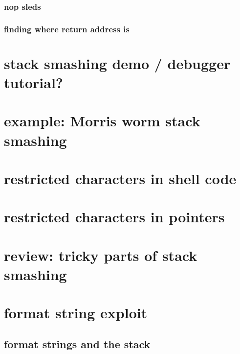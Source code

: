 \subsubsection{nop sleds}




\subsubsection{finding where return address is}


\section{stack smashing demo / debugger tutorial?}


\section{example: Morris worm stack smashing}



\section{restricted characters in shell code}
   

\section{restricted characters in pointers}


\section{review: tricky parts of stack smashing}


\section{format string exploit}

\subsection{format strings and the stack}


